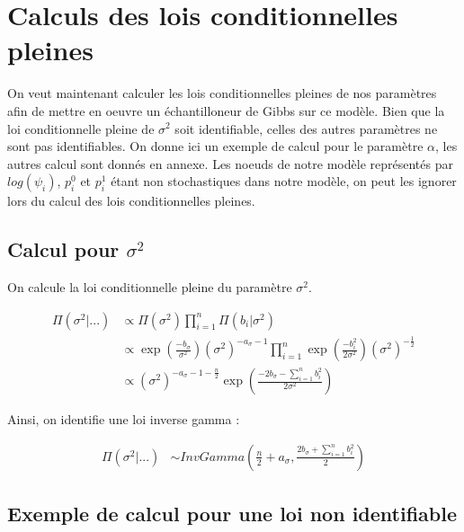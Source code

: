 \documentclass[
]{article}
\begin{document}
\hypertarget{calculs-des-lois-conditionnelles-pleines}{%
\section{Calculs des lois conditionnelles
pleines}\label{calculs-des-lois-conditionnelles-pleines}}

On veut maintenant calculer les lois conditionnelles pleines de nos
paramètres afin de mettre en oeuvre un échantilloneur de Gibbs sur ce
modèle. Bien que la loi conditionnelle pleine de \(\sigma^2\) soit
identifiable, celles des autres paramètres ne sont pas identifiables. On
donne ici un exemple de calcul pour le paramètre \(\alpha\), les autres
calcul sont donnés en annexe. Les noeuds de notre modèle représentés par
\(log(\psi_i)\), \(p_i^0\) et \(p_i^1\) étant non stochastiques dans
notre modèle, on peut les ignorer lors du calcul des lois
conditionnelles pleines.

\hypertarget{calcul-pour-sigma2}{%
\subsection{\texorpdfstring{Calcul pour
\(\sigma^2\)}{Calcul pour \textbackslash sigma\^{}2}}\label{calcul-pour-sigma2}}

On calcule la loi conditionnelle pleine du paramètre \(\sigma^2\).

\begin{align*}
\Pi(\sigma^2|...) &\propto \Pi(\sigma^2) \prod_{i=1}^n\Pi(b_i|\sigma^2) \\
&\propto \exp\left({\frac{-b_{\sigma}}{\sigma^2}}\right)(\sigma^2)^{-a_{\sigma}-1}\prod_{i=1}^{n} \exp\left(\frac{-b_i^2}{2\sigma^2}\right)(\sigma^2)^{-\frac{1}{2}} \\
&\propto (\sigma^2)^{-a_{\sigma}-1-\frac{n}{2}} \exp\left(\frac{-2b_{\sigma}-\sum\limits_{i=1}^n b_i^2}{2\sigma^2}\right)
\end{align*}

Ainsi, on identifie une loi inverse gamma :

\begin{align*}
\Pi(\sigma^2|...) &\sim InvGamma(\frac{n}{2}+a_{\sigma},\frac{2b_{\sigma}+\sum\limits_{i=1}^n b_i^2}{2})
\end{align*}

\hypertarget{exemple-de-calcul-pour-une-loi-non-identifiable}{%
\subsection{Exemple de calcul pour une loi non
identifiable}\label{exemple-de-calcul-pour-une-loi-non-identifiable}}
\end{document}
